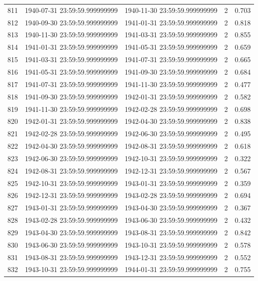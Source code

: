 \begin{table}
\begin{tabular}{lcccc}
811 & 1940-07-31 23:59:59.999999999 & 1940-11-30 23:59:59.999999999 & 2 & 0.703 \\
812 & 1940-09-30 23:59:59.999999999 & 1941-01-31 23:59:59.999999999 & 2 & 0.818 \\
813 & 1940-11-30 23:59:59.999999999 & 1941-03-31 23:59:59.999999999 & 2 & 0.855 \\
814 & 1941-01-31 23:59:59.999999999 & 1941-05-31 23:59:59.999999999 & 2 & 0.659 \\
815 & 1941-03-31 23:59:59.999999999 & 1941-07-31 23:59:59.999999999 & 2 & 0.665 \\
816 & 1941-05-31 23:59:59.999999999 & 1941-09-30 23:59:59.999999999 & 2 & 0.684 \\
817 & 1941-07-31 23:59:59.999999999 & 1941-11-30 23:59:59.999999999 & 2 & 0.477 \\
818 & 1941-09-30 23:59:59.999999999 & 1942-01-31 23:59:59.999999999 & 2 & 0.582 \\
819 & 1941-11-30 23:59:59.999999999 & 1942-02-28 23:59:59.999999999 & 2 & 0.698 \\
820 & 1942-01-31 23:59:59.999999999 & 1942-04-30 23:59:59.999999999 & 2 & 0.838 \\
821 & 1942-02-28 23:59:59.999999999 & 1942-06-30 23:59:59.999999999 & 2 & 0.495 \\
822 & 1942-04-30 23:59:59.999999999 & 1942-08-31 23:59:59.999999999 & 2 & 0.618 \\
823 & 1942-06-30 23:59:59.999999999 & 1942-10-31 23:59:59.999999999 & 2 & 0.322 \\
824 & 1942-08-31 23:59:59.999999999 & 1942-12-31 23:59:59.999999999 & 2 & 0.567 \\
825 & 1942-10-31 23:59:59.999999999 & 1943-01-31 23:59:59.999999999 & 2 & 0.359 \\
826 & 1942-12-31 23:59:59.999999999 & 1943-02-28 23:59:59.999999999 & 2 & 0.694 \\
827 & 1943-01-31 23:59:59.999999999 & 1943-04-30 23:59:59.999999999 & 2 & 0.367 \\
828 & 1943-02-28 23:59:59.999999999 & 1943-06-30 23:59:59.999999999 & 2 & 0.432 \\
829 & 1943-04-30 23:59:59.999999999 & 1943-08-31 23:59:59.999999999 & 2 & 0.842 \\
830 & 1943-06-30 23:59:59.999999999 & 1943-10-31 23:59:59.999999999 & 2 & 0.578 \\
831 & 1943-08-31 23:59:59.999999999 & 1943-12-31 23:59:59.999999999 & 2 & 0.552 \\
832 & 1943-10-31 23:59:59.999999999 & 1944-01-31 23:59:59.999999999 & 2 & 0.755 \\

\end{tabular}
\end{table}
